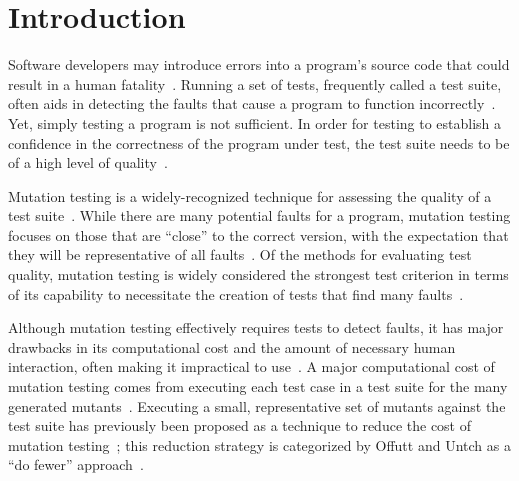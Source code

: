 
\section{Introduction}



Software developers may introduce errors into a program's source code that could result in a human
fatality~\cite{vicente2003programming}. Running a set of tests, frequently called a test suite, often aids in detecting
the faults that cause a program to function incorrectly~\cite{Kapfhammer2010}. Yet, simply testing a program is not
sufficient. In order for testing to establish a confidence in the correctness of the program under test, the test suite
needs to be of a high level of quality~\cite{Kapfhammer2004}.


Mutation testing is a widely-recognized technique for assessing the quality of a test suite~\cite{gopinath2015mutation}.
While there are many potential faults for a program, mutation testing focuses on those that are ``close'' to the correct
version, with the expectation that they will be representative of all faults~\cite{jia2011analysis}. Of the methods for
evaluating test quality, mutation testing is widely considered the strongest test criterion in terms of its capability
to necessitate the creation of tests that find many faults~\cite{ammann2008introduction}.


Although mutation testing effectively requires tests to detect faults, it has major drawbacks in its computational cost
and the amount of necessary human interaction, often making it impractical to use~\cite{gopinath2015mutation, Just2011a,
gopinath2015empirical}.  A major computational cost of mutation testing comes from executing each test case in a test
suite for the many generated mutants~\cite{Just2012b, offutt1993experimental}. Executing a small, representative set of
mutants against the test suite has previously been proposed as a technique to reduce the cost of mutation
testing~\cite{jia2011analysis, wong1995reducing, offutt1993experimental}; this reduction strategy is categorized by
Offutt and Untch as a ``do fewer'' approach~\cite{offutt2001mutation}.

